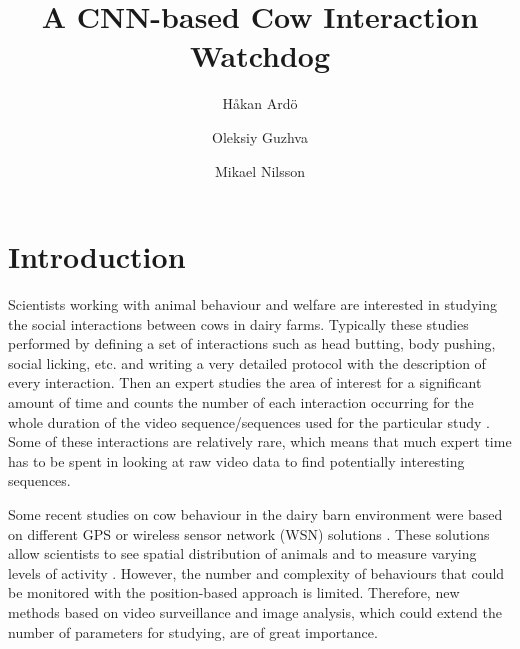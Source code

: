 \documentclass{IET}
\begin{document}
\title{A CNN-based Cow Interaction Watchdog}
\author[1*]{Håkan Ardö}
\author[2]{Oleksiy Guzhva}
\author[1]{Mikael Nilsson}


\maketitle

\section{Introduction}

Scientists working with animal behaviour and welfare are interested in studying the social interactions between cows in dairy farms. Typically these studies performed by defining a set of interactions such as head butting, body pushing, social licking, etc. and writing a very detailed protocol with the description of every interaction. Then an expert studies the area of interest for a significant amount of time and counts the number of each interaction occurring for the whole duration of the video sequence/sequences used for the particular study \cite{MartinandBateson2007}. Some of these interactions are relatively rare, which means that much expert time has to be spent in looking at raw video data to find potentially interesting sequences.

Some recent studies on cow behaviour in the dairy barn environment were based on different GPS or wireless sensor network (WSN) solutions \cite{Nadimietal2012}. These solutions allow scientists to see spatial distribution of animals and to measure varying levels of activity \cite{Nadimietal2012}. However, the number and complexity of behaviours that could be monitored with the position-based approach is limited. Therefore, new methods based on video surveillance and image analysis, which could extend the number of parameters for studying, are of great importance.
\end{document}
